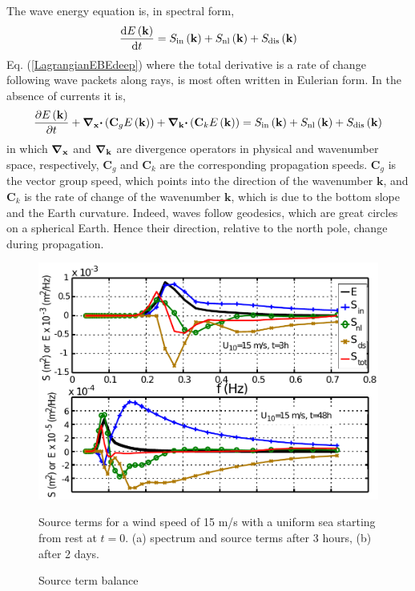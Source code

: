 The wave energy equation is, in spectral form, 
\begin{equation}
    \frac{\mathrm{d} E\left(\mathbf{k}\right)}{\mathrm{d} t}=
    S_{\mathrm{in}}\left(\mathbf{k}\right)+
    S_{\mathrm{nl}}\left(\mathbf{k}\right)+S_{\mathrm{dis}}\left(\mathbf{k}\right)
    \label{LagrangianEBEdeep}
\end{equation}
Eq. 
(\ref{LagrangianEBEdeep}) where the total derivative is a rate of change following wave packets along rays, 
is most often written in Eulerian form. In the absence of currents it is, 
\begin{equation}
    \frac{\partial E\left(\mathbf{k}\right)}{\partial t}
    +\mbox{\boldmath $\nabla$}_{\mathbf x} \mbox{\boldmath $\cdot$} \left({\mathbf C}_g E\left(\mathbf{k}\right)\right)
    +\mbox{\boldmath $\nabla$}_{\mathbf{k}} \mbox{\boldmath $\cdot$} \left({\mathbf C}_k E\left(\mathbf{k}\right)\right)
    =S_{\mathrm{in}}\left(\mathbf{k}\right)+
    S_{\mathrm{nl}}\left(\mathbf{k}\right)+S_{\mathrm{dis}}\left(\mathbf{k}\right)
    \label{EulerianEBEdeep}
\end{equation}
in which $\mbox{\boldmath $\nabla$}_{\mathbf x}$ and $\mbox{\boldmath $\nabla$}_{\mathbf{k}}$ are divergence operators in physical and wavenumber space, respectively, 
${\mathbf C}_g$ and ${\mathbf C}_k$ are the corresponding propagation speeds.  ${\mathbf C}_g$ is the vector 
group speed, which points into the direction of the wavenumber $\mathbf{k}$, and  ${\mathbf C}_k$ is the rate of change of 
the wavenumber  $\mathbf{k}$, which is due to the bottom slope and the Earth curvature. Indeed, waves follow geodesics, 
which are great circles on a spherical Earth. Hence their direction, relative to the north pole, change during 
propagation. 

\begin{figure}
\centerline{\includegraphics[width=\textwidth]{FIGS_CH_SOURCETERMS/sourcetermsbalance_TEST420.pdf}}
\caption{Source term balance}{Source terms for a wind speed of 15 m/s with a uniform sea starting from rest at $t=0$.
(a) spectrum and source terms after 3 hours, (b) after 2 days.} \label{fig_sourceterms}
\end{figure}

